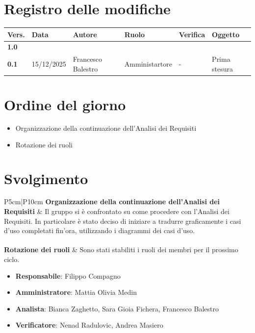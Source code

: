 \documentclass[a4paper,12pt]{article}
\begin{document}
    

    \newpage
    \section*{Registro delle modifiche}

    \begin{table}[h!]
        \begin{tabularx}{\textwidth}{|l|l|l|l|X|X|}
            \hline
            \textbf{Vers.} & \textbf{Data} & \textbf{Autore} & \textbf{Ruolo} & \textbf{Verifica} & \textbf{Oggetto} \\
            \hline
            \textbf{1.0} &  &  &  & &  \\
            \hline
            \textbf{0.1} & 15/12/2025 & Francesco Balestro & Amministartore & - & Prima stesura \\
        \hline
        \end{tabularx}
    \end{table}

    \newpage
    \tableofcontents
    \newpage

    \section{Ordine del giorno} {
        \begin{itemize}
            \item Organizzazione della continuazione dell'Analisi dei Requisiti
            \item Rotazione dei ruoli
        \end{itemize}
    }

    \section{Svolgimento} {
        \begin{longtable}{P{5cm}|P{10cm}} 
            \textbf{Organizzazione della continuazione dell'Analisi dei Requisiti} & Il gruppo si è confrontato su come procedere con l'Analisi dei Requisiti. In particolare è stato deciso di iniziare a tradurre graficamente i casi d'uso completati fin'ora, utilizzando i diagrammi dei casi d'uso.\\\\
            \textbf{Rotazione dei ruoli} & Sono stati stabiliti i ruoli dei membri per il prossimo ciclo.
            \begin{itemize}
                \item \textbf{Responsabile}: Filippo Compagno
                \item \textbf{Amministratore}: Mattia Olivia Medin
                \item \textbf{Analista}: Bianca Zaghetto, Sara Gioia Fichera, Francesco Balestro
                \item \textbf{Verificatore}: Nenad Radulovic, Andrea Masiero
            \end{itemize}\\\\
        \end{longtable}
    }
\end{document}
